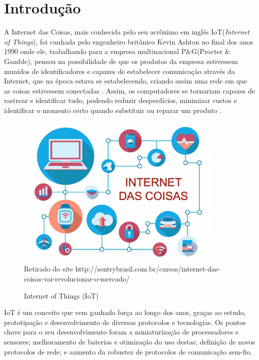 \chapter[Introdução]{Introdução}
\label{cap:intro}

A Internet das Coisas, mais conhecida pelo seu acrônimo em inglês IoT(\emph{Internet of Things}), foi cunhada pelo engenheiro britânico Kevin Ashton no final dos anos 1990 onde ele, trabalhando para a empresa multinacional P\&G(Procter \& Gamble), pensou na possibilidade de que os produtos da empresa estivessem munidos de identificadores e capazes de estabelecer comunicação através da Internet, que na época estava se estabelecendo, criando assim uma rede em que as coisas estivessem conectadas \cite{KA_IOT}. Assim, os computadores se tornariam capazes de rastrear e identificar tudo, podendo reduzir desperdícios, minimizar custos e identificar o momento certo quando substituir ou reparar um produto \cite{lopezIOT}.

\begin{figure}[ht]
    \centering
    \caption{Internet of Things (IoT)}
    \includegraphics[width=10cm]{./sections/textual/chapters/images/intro_iot.jpg}\\
    Retirado do site http://sentrybrasil.com.br/cursos/internet-das-coisas-vai-revolucionar-o-mercado/
    \label{fig:iotimg}
\end{figure}

IoT é um conceito que vem ganhado força ao longo dos anos, graças ao estudo, prototipação e desenvolvimento de diversas protocolos e tecnologias. Os pontos chave para o seu desenvolvimento foram a miniaturização de processadores e sensores; melhoramento de baterias e otimização do uso destas; definição de novos protocolos de rede; e aumento da robustez de protocolos de comunicação sem-fio.

